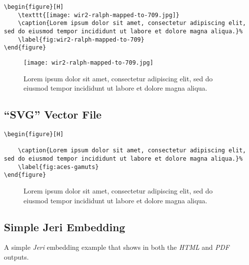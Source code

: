 \begin{lstlisting}[caption={Embedding a ``JPG'' raster file.}]
\begin{figure}[H]
    \texttt{[image: wir2-ralph-mapped-to-709.jpg]}
    \caption{Lorem ipsum dolor sit amet, consectetur adipiscing elit, sed do eiusmod tempor incididunt ut labore et dolore magna aliqua.}%
    \label{fig:wir2-ralph-mapped-to-709}
\end{figure}
\end{lstlisting}

\begin{figure}[H]
    \texttt{[image: wir2-ralph-mapped-to-709.jpg]}
    \caption{Lorem ipsum dolor sit amet, consectetur adipiscing elit, sed do eiusmod tempor incididunt ut labore et dolore magna aliqua.}%
    \label{fig:wir2-ralph-mapped-to-709}
\end{figure}

\subsection*{``SVG'' Vector File}%
\label{subsec:svg-vector-file}

\begin{lstlisting}[caption={Embedding a ``SVG'' vector file.}]
\begin{figure}[H]
    
    \caption{Lorem ipsum dolor sit amet, consectetur adipiscing elit, sed do eiusmod tempor incididunt ut labore et dolore magna aliqua.}%
    \label{fig:aces-gamuts}
\end{figure}
\end{lstlisting}

\begin{figure}[H]
    
    \caption{Lorem ipsum dolor sit amet, consectetur adipiscing elit, sed do eiusmod tempor incididunt ut labore et dolore magna aliqua.}%
    \label{fig:aces-gamuts}
\end{figure}

\subsection*{Simple Jeri Embedding}%

A simple \textit{Jeri} embedding example that shows in both the \textit{HTML} and \textit{PDF} outputs.

